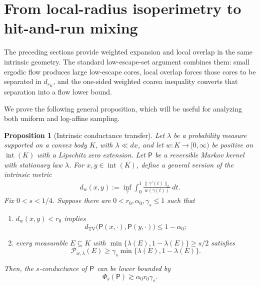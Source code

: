 \documentclass[11pt]{article}
\newtheorem{proposition}[theorem]{Proposition}
\theoremstyle{definition}
\theoremstyle{remark}
\newcommand{\cP}{\mathcal P}
\newcommand{\dtv}{d_{\mathrm{TV}}}
\newcommand{\rK}{r_K}
\begin{document}
\section{From local-radius isoperimetry to hit-and-run mixing}
\label{sec:conductance}
The preceding sections provide weighted expansion and local overlap in the same intrinsic geometry. The standard low-escape-set argument combines them: small ergodic flow produces large low-escape cores, local overlap forces those cores to be separated in \(d_{\rK}\), and the one-sided weighted coarea inequality converts that separation into a flow lower bound. 

We prove the following general proposition, which will be useful for analyzing both uniform and log-affine sampling.

\begin{proposition}[Intrinsic conductance transfer]
\label{prop:conductance-transfer}
Let $\lambda$ be a probability measure supported on a convex body $K$, with $\lambda\ll dx$, and let $w:K\to[0,\infty)$ be positive on $\operatorname{int}(K)$ with a Lipschitz zero extension.  Let $\mathsf P$ be a reversible Markov kernel with stationary law $\lambda$. For $x,y\in\operatorname{int}(K)$, define a general version of the intrinsic metric
\begin{align}\label{eq:def_intrinsic_metric_general}
 d_w(x,y):=\inf_\gamma\int_0^1\frac{\|\gamma'(t)\|_2}{w(\gamma(t))}\,dt.
\end{align}
Fix $0<s<1/4$. Suppose there are $0<r_0,\alpha_0,\gamma_s\le1$ such that
\begin{enumerate}[label=\textup{(\roman*)}]
\item $d_w(x,y)<r_0$ implies
\[
 \dtv\bigl(\mathsf P(x,\cdot),\mathsf P(y,\cdot)\bigr)
 \le1-\alpha_0;
\]
\item every measurable $E\subseteq K$ with
$\min\{\lambda(E),1-\lambda(E)\}\ge s/2$ satisfies
\[
 \cP_{w,\lambda}(E)
 \ge\gamma_s\min\{\lambda(E),1-\lambda(E)\}.
\]
\end{enumerate}
Then, the $s$-conductance of ${\sf P}$ can be lower bounded by
\begin{equation}\label{eq:conductance-transfer}
 \Phi_s(\mathsf P)
 \gtrsim
 \alpha_0r_0\gamma_s.
\end{equation}
\end{proposition}
\end{document}
